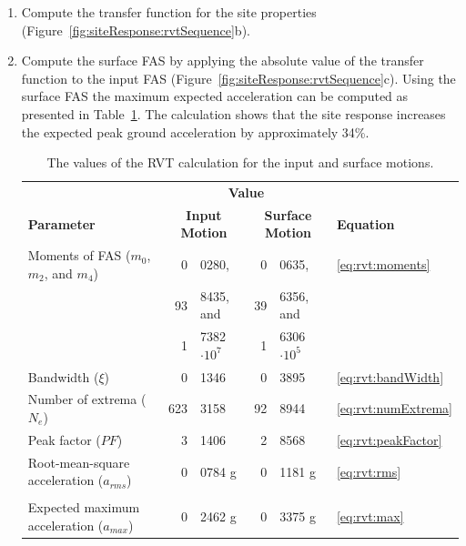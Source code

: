 \documentclass[11pt]{report}
\begin{document}
\begin{enumerate}
  \item Compute the transfer function for the site properties
	(Figure~\ref{fig:siteResponse:rvtSequence}b).
  \item Compute the surface FAS by applying the absolute value of the transfer function to the input
	  FAS (Figure~\ref{fig:siteResponse:rvtSequence}c).  Using the surface FAS the maximum expected
	  acceleration can be computed as presented in Table~\ref{tab:rvtSequence:surface}.  The
	  calculation shows that the site response increases the expected peak ground acceleration by
	  approximately 34\%.

	\begin{table}
	  \centering
	  \begin{tabular}{l r @{.} l  r @{.} l l}
		\hline\hline
		& \multicolumn{4}{c}{\textbf{Value}}  \\
		\textbf{Parameter} & \multicolumn{2}{c}{\textbf{Input Motion}} &
		\multicolumn{2}{c}{\textbf{Surface Motion}} & \textbf{Equation} \\
		\hline
		Moments of FAS ($m_0$, $m_2$, and $m_4$) & 0&0280, & 0&0635, & \ref{eq:rvt:moments} \\
		& 93&8435, and & 39&6356, and \\
		& 1&7382 $\cdot 10^7$ & 1&6306 $\cdot 10^5$  \\
		Bandwidth ($\xi$) & 0&1346 & 0&3895 & \ref{eq:rvt:bandWidth} \\
		Number of extrema ($N_e$) & 623&3158 & 92&8944 & \ref{eq:rvt:numExtrema} \\
		Peak factor ($PF$) & 3&1406 & 2&8568 & \ref{eq:rvt:peakFactor} \\
		Root-mean-square acceleration ($a_{rms}$) & 0&0784 g & 0&1181 g & \ref{eq:rvt:rms} \\
		\\
		Expected maximum acceleration ($a_{max}$) & 0&2462 g & 0&3375 g & \ref{eq:rvt:max} \\
		\hline\hline
	  \end{tabular}
	  \caption{The values of the RVT calculation for the input and surface motions.}
	  \label{tab:rvtSequence:surface}
	\end{table}

\end{enumerate}
\end{document}
